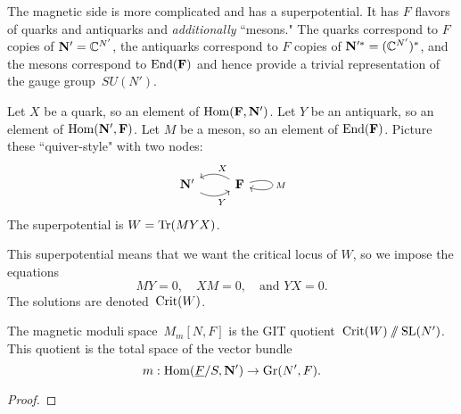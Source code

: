 \documentclass[11pt]{amsart}
\begin{document}
The magnetic side is more complicated and has a superpotential. 
It has $F$ flavors of quarks and antiquarks and {\it additionally} ``mesons." 
The quarks correspond to $F$ copies of $\mathbf N' = \mathbb C^{N'}$, 
the antiquarks correspond to $F$ copies of $\mathbf N'^*= (\mathbb C^{N'})^*$, 
and the mesons correspond to ${\rm End}(\mathbf F)$ 
and hence provide a trivial representation of the gauge group~$SU(N')$. 

Let $X$ be a quark, so an element of ${\rm Hom}(\mathbf F, \mathbf N')$.
Let $Y$ be an antiquark, so an element of ${\rm Hom}(\mathbf N', \mathbf F)$.
Let $M$ be a meson, so an element of ${\rm End}(\mathbf F)$.
Picture these ``quiver-style" with two nodes: 
\[
\begin{tikzcd}
\bN' \arrow[r, bend right, "Y"'] & \bF \arrow[l, bend right, "X"'] \arrow[loop right, looseness=15, "M"]
\end{tikzcd}
\]
The superpotential is $W=\operatorname{Tr}(MYX)$.

This superpotential means that we want the critical locus of $W$, 
so we impose the equations 
\[
MY = 0, \quad XM = 0, \quad \text{and } YX = 0. 
\]
The solutions are denoted~$\operatorname{Crit}(W)$.

\begin{prop}
The magnetic moduli space~$M_m[N,F]$ is the GIT quotient~$\operatorname{Crit}(W)\mathbin{/\mkern-6mu/} \operatorname{SL}(N')$. 
This quotient is the total space of the vector bundle
\[
m: {\rm Hom}(\underline{F}/S, \mathbf N') \to {\rm Gr}(N',F).
\]
\end{prop}

\begin{proof}

\end{proof}
\end{document}
